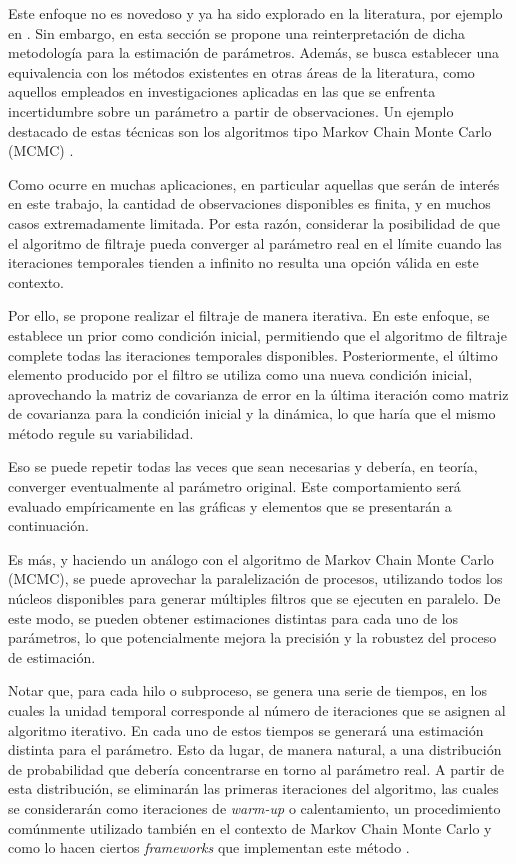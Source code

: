 Este enfoque no es novedoso y ya ha sido explorado en la literatura, por ejemplo en \cite{Deng2013AdaptiveObjects, Jiang2007AEstimation, Kandepu2008ApplyingEstimation}. Sin embargo, en esta sección se propone una reinterpretación de dicha metodología para la estimación de parámetros. Además, se busca establecer una equivalencia con los métodos existentes en otras áreas de la literatura, como aquellos empleados en investigaciones aplicadas en las que se enfrenta incertidumbre sobre un parámetro a partir de observaciones. Un ejemplo destacado de estas técnicas son los algoritmos tipo Markov Chain Monte Carlo (MCMC) \cite{Sammut2010EncyclopediaLearning}.

Como ocurre en muchas aplicaciones, en particular aquellas que serán de interés en este trabajo, la cantidad de observaciones disponibles es finita, y en muchos casos extremadamente limitada. Por esta razón, considerar la posibilidad de que el algoritmo de filtraje pueda converger al parámetro real en el límite cuando las iteraciones temporales tienden a infinito no resulta una opción válida en este contexto.

Por ello, se propone realizar el filtraje de manera iterativa. En este enfoque, se establece un prior como condición inicial, permitiendo que el algoritmo de filtraje complete todas las iteraciones temporales disponibles. Posteriormente, el último elemento producido por el filtro se utiliza como una nueva condición inicial, aprovechando la matriz de covarianza de error en la última iteración como matriz de covarianza para la condición inicial y la dinámica, lo que haría que el mismo método regule su variabilidad.

Eso se puede repetir todas las veces que sean necesarias y debería, en teoría, converger eventualmente al parámetro original. Este comportamiento será evaluado empíricamente en las gráficas y elementos que se presentarán a continuación.

Es más, y haciendo un análogo con el algoritmo de Markov Chain Monte Carlo (MCMC), se puede aprovechar la paralelización de procesos, utilizando todos los núcleos disponibles para generar múltiples filtros que se ejecuten en paralelo. De este modo, se pueden obtener estimaciones distintas para cada uno de los parámetros, lo que potencialmente mejora la precisión y la robustez del proceso de estimación.

Notar que, para cada hilo o subproceso, se genera una serie de tiempos, en los cuales la unidad temporal corresponde al número de iteraciones que se asignen al algoritmo iterativo. En cada uno de estos tiempos se generará una estimación distinta para el parámetro. Esto da lugar, de manera natural, a una distribución de probabilidad que debería concentrarse en torno al parámetro real. A partir de esta distribución, se eliminarán las primeras iteraciones del algoritmo, las cuales se considerarán como iteraciones de \textit{warm-up} o calentamiento, un procedimiento comúnmente utilizado también en el contexto de Markov Chain Monte Carlo y como lo hacen ciertos \textit{frameworks} que implementan este método \cite{Patil2010PyMC:Python, Carpenter2017Stan:Language, Burkner2017Brms:Stan, Abril-Pla2023PyMC:Python}.

